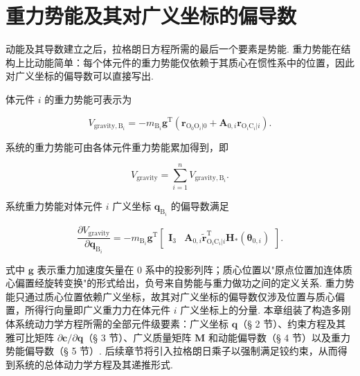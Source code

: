 \section{重力势能及其对广义坐标的偏导数}
动能及其导数建立之后，拉格朗日方程所需的最后一个要素是势能. 重力势能在结构上比动能简单：每个体元件的重力势能仅依赖于其质心在惯性系中的位置，因此对广义坐标的偏导数可以直接写出.
\begin{conclusion}[结论 9.7（重力势能及其偏导数）]
体元件 $i$ 的重力势能可表示为

\[
V_{\text{gravity},\text{B}_i} = -m_{\text{B}_i} \boldsymbol{g}^\text{T} (\boldsymbol{r}_{\text{O}_0\text{O}_i|0} + \boldsymbol{A}_{0,i} \boldsymbol{r}_{\text{O}_i\text{C}_i|i}).
\]

系统的重力势能可由各体元件重力势能累加得到，即

\[
V_{\text{gravity}} = \sum_{i=1}^{n} V_{\text{gravity},\text{B}_i}.
\]

系统重力势能对体元件 $i$ 广义坐标 $\boldsymbol{q}_{\text{B}_i}$ 的偏导数满足

\[
\frac{\partial V_{\text{gravity}}}{\partial \boldsymbol{q}_{\text{B}_i}} = -m_{\text{B}_i} \boldsymbol{g}^\text{T} \begin{bmatrix} \boldsymbol{I}_3 & \boldsymbol{A}_{0,i} \tilde{\boldsymbol{r}}_{\text{O}_i\text{C}_i|i}^\text{T} \boldsymbol{H}_*(\boldsymbol{\theta}_{0,i}) \end{bmatrix}.
\]
\end{conclusion}
式中 $\boldsymbol{g}$ 表示重力加速度矢量在 0 系中的投影列阵；质心位置以"原点位置加连体质心偏置经旋转变换"的形式给出，负号来自势能与重力做功之间的定义关系. 重力势能只通过质心位置依赖广义坐标，故其对广义坐标的偏导数仅涉及位置与质心偏置，所得行向量即广义重力力在体元件 $i$ 广义坐标上的分量.
本章组装了构造多刚体系统动力学方程所需的全部元件级要素：广义坐标 $\boldsymbol{q}$（§ 2 节）、约束方程及其雅可比矩阵 $\partial \boldsymbol{c} / \partial \boldsymbol{q}$（§ 3 节）、广义质量矩阵 $\boldsymbol{M}$ 和动能偏导数（§ 4 节）以及重力势能偏导数（§ 5 节）. 后续章节将引入拉格朗日乘子以强制满足铰约束，从而得到系统的总体动力学方程及其递推形式.
